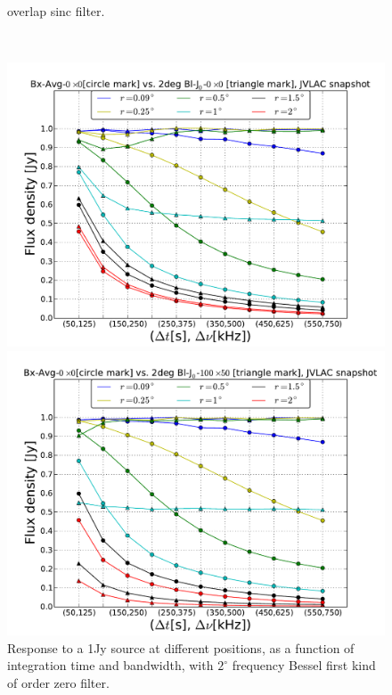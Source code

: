 \documentclass[useAMS,usenatbib]{mn2e}
\begin{document}
\begin{figure}
\begin{minipage}{0.36\linewidth}
{ overlap sinc filter.}
    \label{fig:max-integ-timefreq-sinc-w100x50-fov2}\end{minipage}\\
\begin{minipage}{0.36\linewidth}\includegraphics[width=1\textwidth]{./Figures/max-integ-timefreq-bessel-w1x1-fov2.pdf}
      \caption{Response to a 1Jy source at different positions, as a function of integration time and bandwidth, with $2^{\circ}$ frequency 
Bessel first kind of order zero filter.}
      \label{fig:max-integ-timefreq-bessel-w1x1-fov2}\end{minipage}
\hspace{1cm}
\begin{minipage}{0.36\linewidth}\includegraphics[width=1\textwidth]{./Figures/max-integ-timefreq-bessel-w100x50-fov2.pdf}

\end{minipage}
\end{figure}
\end{document}
